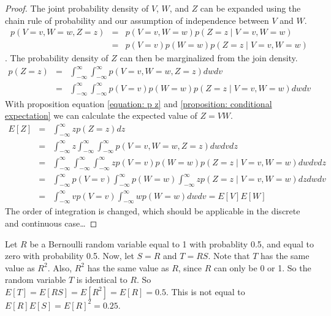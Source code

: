 \documentclass[12pt]{article}
\newcommand{\propref}[1]{\ref{proposition: #1}}
\newcommand{\eqnref}[1]{\ref{equation: #1}}
\begin{document}
\begin{proof}
    The joint probability density of $V$, $W$, and $Z$ can be expanded using the chain rule of probability and our assumption of independence between $V$ and $W$.
    \begin{eqnarray}
        p(V=v, W=w, Z=z) &=& p(V=v, W=w)p(Z=z \mid V=v,W=w) \nonumber \\
            &=& p(V=v)p(W=w)p(Z=z \mid V=v,W=w)
            \label{equation: joint density}
    \end{eqnarray}.
    The probability density of $Z$ can then be marginalized from the join density.
    \begin{eqnarray}
        p(Z=z) &=& \int_{-\infty}^{\infty} \int_{-\infty}^{\infty} p(V=v, W=w, Z=z) dwdv \nonumber \\
        &=& \int_{-\infty}^{\infty} \int_{-\infty}^{\infty} p(V=v)p(W=w)p(Z=z \mid V=v,W=w) dwdv
        \label{equation: p z}
    \end{eqnarray}
    With proposition equation \eqnref{p z} and \propref{conditional expectation} we can calculate the expected value of $Z=VW$.
    \begin{eqnarray}
        E[Z] &=& \int_{-\infty}^{\infty} zp(Z=z)dz \nonumber \\
        &=& \int_{-\infty}^{\infty} z \int_{-\infty}^{\infty} \int_{-\infty}^{\infty} p(V=v,W=w,Z=z) dwdvdz \nonumber \\
        &=& \int_{-\infty}^{\infty} \int_{-\infty}^{\infty} \int_{-\infty}^{\infty} zp(V=v)p(W=w)p(Z=z \mid V=v,W=w) dwdvdz \nonumber \\
        &=& \int_{-\infty}^{\infty} p(V=v) \int_{-\infty}^{\infty} p(W=w) \int_{-\infty}^{\infty} zp(Z=z \mid V=v,W=w) dzdwdv \nonumber \\
        &=& \int_{-\infty}^{\infty} vp(V=v) \int_{-\infty}^{\infty} wp(W=w) dw dv = E[V]E[W]
        \label{equation: z_mean}
    \end{eqnarray}
    The order of integration is changed, which should be applicable in the discrete and continuous case\dots
\end{proof}

Let $R$ be a Bernoulli random variable equal to 1 with probablity 0.5, and equal to zero with probability 0.5.
Now, let $S=R$ and $T=RS$.
Note that $T$ has the same value as $R^2$.
Also, $R^2$ has the same value as $R$, since $R$ can only be 0 or 1.
So the random variable $T$ is identical to $R$.
So $E[T]=E[RS]=E[R^2]=E[R]=0.5$. This is not equal to $E[R]E[S]=E[R]^2=0.25$.




%
%

\end{document}
